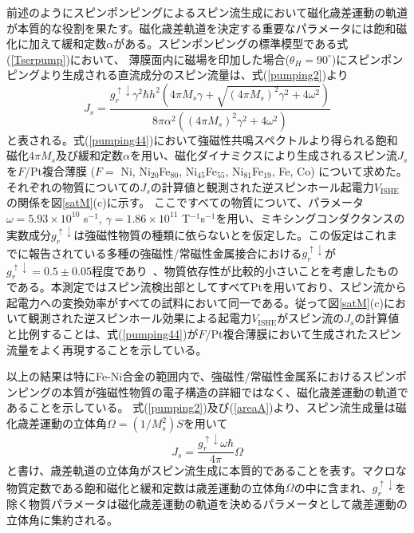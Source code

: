 前述のようにスピンポンピングによるスピン流生成において磁化歳差運動の軌道が本質的な役割を果たす。磁化歳差軌道を決定する重要なパラメータには飽和磁化に加えて緩和定数$\alpha$がある。スピンポンピングの標準模型である式(\ref{Tserpump})において、
薄膜面内に磁場を印加した場合($\theta_H=90^\circ$)にスピンポンピングより生成される直流成分のスピン流量は、式(\ref{pumping2})より
\begin{equation}
J_s=\frac{  g^{\uparrow\downarrow}_r \gamma^2  \hbar h^2\left(4 \pi  M_s \gamma +\sqrt{(4 \pi
 M_s)^2 \gamma ^2+4 \omega ^2}\right)}{8 \pi \alpha^2  \left((4 \pi  M_s)^2 \gamma ^2 +4 \omega ^2\right)}\label{pumping44}
\end{equation}
と表される。式(\ref{pumping44})において強磁性共鳴スペクトルより得られる飽和磁化$4\pi M_s$及び緩和定数$\alpha$を用い、磁化ダイナミクスにより生成されるスピン流$J_s$を$F$/Pt複合薄膜 ($F=$ Ni, Ni$_{20}$Fe$_{80}$, Ni$_{45}$Fe$_{55}$, Ni$_{81}$Fe$_{19}$, Fe, Co) について求めた。それぞれの物質についての$J_s$の計算値と観測された逆スピンホール起電力$V_\text{ISHE}$の関係を図\ref{satM}(c)に示す。
ここですべての物質について、パラメータ$\omega=5.93\times 10^{10}$ s$^{-1}$, $\gamma=1.86\times 10^{11}$ T$^{-1}$s$^{-1}$を用い、ミキシングコンダクタンスの実数成分$g^{\uparrow\downarrow}_r$は強磁性物質の種類に依らないとを仮定した。この仮定はこれまでに報告されている多種の強磁性/常磁性金属接合における$g^{\uparrow\downarrow}_r$が$g^{\uparrow\downarrow}_r=0.5\pm 0.05$程度であり~\cite{Zwierzycki}、物質依存性が比較的小さいことを考慮したものである。本測定ではスピン流検出部としてすべてPtを用いており、スピン流から起電力への変換効率がすべての試料において同一である。従って図\ref{satM}(c)において観測された逆スピンホール効果による起電力$V_\text{ISHE}$がスピン流の$J_s$の計算値と比例することは、式(\ref{pumping44})が$F$/Pt複合薄膜において生成されたスピン流量をよく再現することを示している。

以上の結果は特にFe-Ni合金の範囲内で、強磁性/常磁性金属系におけるスピンポンピングの本質が強磁性物質の電子構造の詳細ではなく、磁化歳差運動の軌道であることを示している。
式(\ref{pumping2})及び(\ref{areaA})より、スピン流生成量は磁化歳差運動の立体角$\Omega=(1/M_s^2)S$を用いて
\begin{equation}
J_s=\frac{g^{\uparrow\downarrow}_r \omega\hbar}{4\pi }\Omega
\end{equation}
と書け、歳差軌道の立体角がスピン流生成に本質的であることを表す。マクロな物質定数である飽和磁化と緩和定数は歳差運動の立体角$\Omega$の中に含まれ、$g^{\uparrow\downarrow}_r$を除く物質パラメータは磁化歳差運動の軌道を決めるパラメータとして歳差運動の立体角に集約される。


















